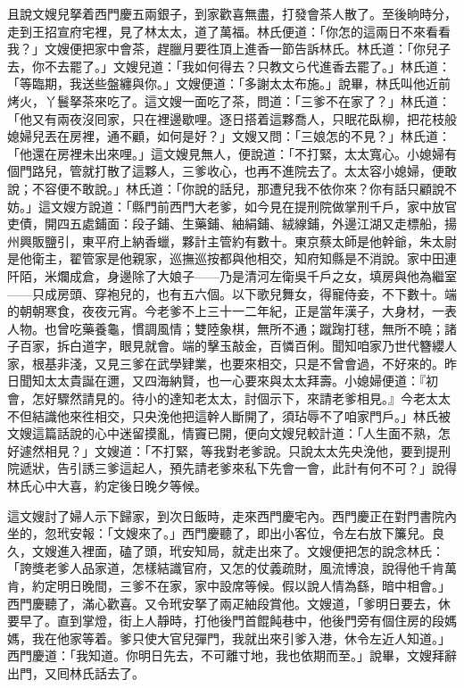 且說文嫂兒拏着西門慶五兩銀子，到家歡喜無盡，打發會茶人散了。至後晌時分，走到王招宣府宅裡，見了林太太，道了萬福。林氏便道：「你怎的這兩日不來看看我？」文嫂便把家中會茶，趕臘月要徃頂上進香一節告訴林氏。林氏道：「你兒子去，你不去罷了。」文嫂兒道：「我如何得去？只教文ら代進香去罷了。」林氏道：「等臨期，我送些盤纏與你。」文嫂便道：「多謝太太布施。」說畢，林氏叫他近前烤火，丫鬟拏茶來吃了。這文嫂一面吃了茶，問道：「三爹不在家了？」林氏道：「他又有兩夜沒囘家，只在裡邊歇哩。逐日搭着這夥喬人，只眠花臥柳，把花枝般媳婦兒丟在房裡，通不顧，如何是好？」文嫂又問：「三娘怎的不見？」林氏道：「他還在房裡未出來哩。」這文嫂見無人，便說道：「不打緊，太太寬心。小媳婦有個門路兒，管就打散了這夥人，三爹收心，也再不進院去了。太太容小媳婦，便敢說；不容便不敢說。」{}林氏道：「你說的話兒，那遭兒我不依你來？你有話只顧說不妨。」這文嫂方說道：「縣門前西門大老爹，如今見在提刑院做掌刑千戶，家中放官吏債，開四五處鋪面：段子鋪、生藥鋪、紬絹鋪、絨線鋪，外邊江湖又走標船，揚州興販鹽引，東平府上納香蠟，夥計主管約有數十。東京蔡太師是他幹爺，朱太尉是他衛主，翟管家是他親家，巡撫巡按都與他相交，知府知縣是不消說。家中田連阡陌，米爛成倉{}，身邊除了大娘子——乃是清河左衛吳千戶之女，填房與他為繼室——只成房頭、穿袍兒的，也有五六個。以下歌兒舞女，得寵侍妾，不下數十。端的朝朝寒食，夜夜元宵。今老爹不上三十一二年紀，正是當年漢子，大身材，一表人物。也曾吃藥養龜，慣調風情；{}雙陸象棋，無所不通；蹴踘打毬，無所不曉；諸子百家，拆白道字，眼見就會。端的擊玉敲金，百憐百俐。聞知咱家乃世代簪纓人家，根基非淺，又見三爹在武學肄業，也要來相交，只是不曾會過，不好來的。昨日聞知太太貴誕在邇，又四海納賢，{}也一心要來與太太拜壽。小媳婦便道：『初會，怎好驟然請見的。待小的達知老太太，討個示下，來請老爹相見。』今老太太不但結識他來徃相交，只央浼他把這幹人斷開了，須玷辱不了咱家門戶。」林氏被文嫂這篇話說的心中迷留摸亂，情竇已開，便向文嫂兒較計道：「人生面不熟，怎好遽然相見？」文嫂道：「不打緊，等我對老爹說。只說太太先央浼他，要到提刑院遞狀，告引誘三爹這起人，預先請老爹來私下先會一會，此計有何不可？」說得林氏心中大喜，約定後日晚夕等候。

這文嫂討了婦人示下歸家，到次日飯時，走來西門慶宅內。西門慶正在對門書院內坐的，忽玳安報：「文嫂來了。」西門慶聽了，即出小客位，令左右放下簾兒。良久，文嫂進入裡面，磕了頭，玳安知局，就走出來了。文嫂便把怎的說念林氏：「誇獎老爹人品家道，怎樣結識官府，又怎的仗義疏財，風流博浪，說得他千肯萬肯，約定明日晚間，三爹不在家，家中設席等候。假以說人情為繇，暗中相會。」西門慶聽了，滿心歡喜。又令玳安拏了兩疋紬段賞他。文嫂道，「爹明日要去，休要早了。直到掌燈，街上人靜時，打他後門首餛飩巷中{}，他後門旁有個住房的段媽媽，我在他家等着。爹只使大官兒彈門，我就出來引爹入港，休令左近人知道。」西門慶道：「我知道。你明日先去，不可離寸地，我也依期而至。」說畢，文嫂拜辭出門，又囘林氏話去了。

